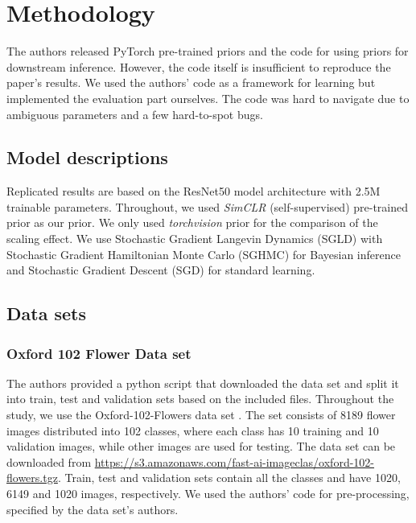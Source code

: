 \section{Methodology}

The authors released PyTorch pre-trained priors and the code for using priors for downstream inference. However, the code itself is insufficient to reproduce the paper's results. We used the authors' code as a framework for learning but implemented the evaluation part ourselves. The code was hard to navigate due to ambiguous parameters and a few hard-to-spot bugs.

\subsection{Model descriptions}

Replicated results are based on the ResNet50 model architecture with 2.5M trainable parameters.
Throughout, we used \textit{SimCLR} (self-supervised) pre-trained prior as our prior. We only used \textit{torchvision} prior for the comparison of the scaling effect. 
We use Stochastic Gradient Langevin Dynamics (SGLD) with Stochastic Gradient Hamiltonian Monte Carlo (SGHMC) for Bayesian inference and Stochastic Gradient Descent (SGD) for standard learning.

\subsection{Data sets}


\subsubsection{Oxford 102 Flower Data set}
The authors provided a python script that downloaded the data set and split it into train, test and validation sets based on the included files. Throughout the study, we use the Oxford-102-Flowers data set \cite{4756141}. The set consists of 8189 flower images distributed into 102 classes, where each class has 10 training and 10 validation images, while other images are used for testing.
The data set can be downloaded from \url{https://s3.amazonaws.com/fast-ai-imageclas/oxford-102-flowers.tgz}. Train, test and validation sets contain all the classes and have 1020, 6149 and 1020 images, respectively.
We used the authors' code for pre-processing, specified by the data set's authors.

